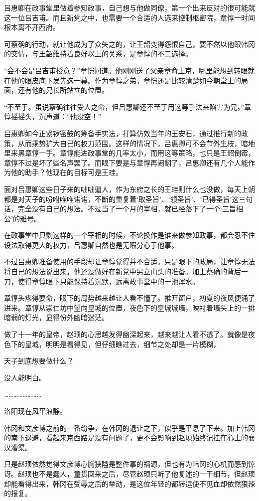 吕惠卿在政事堂里做着参知政事，自己想与他做同僚，第一个出来反对的很可能就这一位吕吉甫。而且新党之中，也需要一个合适的人选来控制枢密院，章惇一时间根本离不开西府。

可蔡确的行动，就让他成为了众矢之的，让王韶变得怨恨自己，要不然以他跟韩冈的交情，与王韶维持着良好以上的关系，是章惇的不二选择。

“会不会是吕吉甫授意？”章恺问道。他刚刚送了父亲章俞上京，哪里能想到转眼就在他的眼皮底下发先这一幕。作为章惇之弟，章恺还是比较清楚如今朝堂上的局面，还有他的兄长所站立的位置。

“不至于。虽说蔡确往往受人之命，但吕惠卿还不至于用这等手法来陷害为兄。”章惇摇摇头，沉声道：“他没空！”

吕惠卿如今正紧锣密鼓的筹备手实法，打算仿效当年的王安石，通过推行新的政策，从而乘势扩大自己的权力范围。这样的情况下，吕惠卿可不会节外生枝，暗地里来黑章惇一手。章惇能进政事堂的几率太小，而用这等策略，也只是王韶倒霉，章惇不过是坏了些名声罢了。而眼下要是与章惇再闹翻了，吕惠卿还有几个人能作为他的助手？他现在的目标可是王珪。

面对吕惠卿这些日子来的咄咄逼人，作为东府之长的王珪则什么也没做，每天上朝都是对天子的吩咐唯唯诺诺，不断的重复着‘取圣旨’、‘领圣旨’、‘已得圣旨’这三句话，完全没有自己的想法。不过当了一个月的宰相，就已经落下了一个‘三旨相公’的雅号。

在政事堂中只剩这样的一个宰相的时候，不论换作是谁来做参知政事，都会忍不住设法取得更大的权力，吕惠卿自然也是无暇分心于他事。

不过吕惠卿准备使用的手段却让章惇觉得并不合适。只是眼下的政局，让章惇无法将自己的想法说出来，他还没做好在新党中另立山头的准备。加上蔡确的背后一刀，使得章惇眼下只能保持着沉默，远离政事堂中的一池浑水。

章惇头疼得要命，眼下的局势越来越让人看不懂了。推开窗户，初夏的夜风便涌了进来。章惇从崇仁坊中望向皇城的位置，夜色下的皇城城墙，映衬着墙头上的一排暗弱的灯光，显得份外幽暗迷茫。

做了十一年的皇帝，赵顼的心思越发得幽深起来，越来越让人看不透了。就像是夜色下的皇城，明明是看得见，但仔细瞧过去，细节之处却是一片模糊，

天子到底想要做什么？

没人能明白。

……………………

洛阳现在风平浪静。

韩冈和文彦博之前的一番纷争，在韩冈的退让之下，似乎是平息了下来。加上韩冈的南下退避，看起来京西路是没有问题了，更不会影响到赵顼始终记挂在心上的襄汉漕渠。

只是赵顼依然觉得文彦博心胸狭隘是整件事的祸源，但也有为韩冈的心机而感到惊讶。赵顼也不是蠢人，童贯回来之后，尽管赵顼只听了他复述的一干细节，但赵顼却能看得出来，韩冈在受辱之后的举动，是这位年轻的都转运使不见血却依然狠辣的报复。

